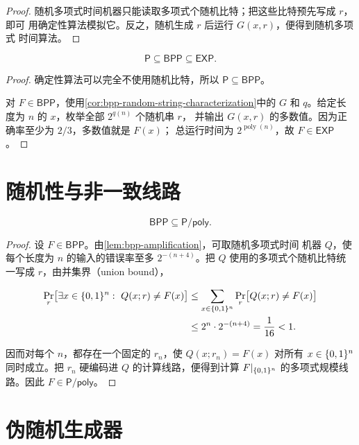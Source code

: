 \begin{proof}
  随机多项式时间机器只能读取多项式个随机比特；把这些比特预先写成 $r$，即可
  用确定性算法模拟它。反之，随机生成 $r$ 后运行 $G(x,r)$，便得到随机多项式
  时间算法。
\end{proof}

\begin{proposition}
  \label{prop:p-subset-bpp-subset-exp}
  \[
    \mathsf P\subseteq\mathsf{BPP}\subseteq\mathsf{EXP}.
  \]
\end{proposition}

\begin{proof}
  确定性算法可以完全不使用随机比特，所以
  $\mathsf P\subseteq\mathsf{BPP}$。

  对 $F\in\mathsf{BPP}$，使用\cref{cor:bpp-random-string-characterization}中的
  $G$ 和 $q$。给定长度为 $n$ 的 $x$，枚举全部 $2^{q(n)}$ 个随机串 $r$，
  并输出 $G(x,r)$ 的多数值。因为正确率至少为 $2/3$，多数值就是 $F(x)$；
  总运行时间为 $2^{\operatorname{poly}(n)}$，故 $F\in\mathsf{EXP}$。
\end{proof}

\section{随机性与非一致线路}

\begin{corollary}
  \label{cor:bpp-subset-p-poly}
  \[
    \mathsf{BPP}\subseteq\mathsf{P/poly}.
  \]
\end{corollary}

\begin{proof}
  设 $F\in\mathsf{BPP}$。由\cref{lem:bpp-amplification}，可取随机多项式时间
  机器 $Q$，使每个长度为 $n$ 的输入的错误率至多 $2^{-(n+4)}$。把 $Q$
  使用的多项式个随机比特统一写成 $r$，由并集界（union bound），

  \begin{align*}
    \Pr_r\bigl[\exists x\in\{0,1\}^n:\ Q(x;r)\neq F(x)\bigr]
      &\leq \sum_{x\in\{0,1\}^n}
        \Pr_r\bigl[Q(x;r)\neq F(x)\bigr] \\
      &\leq 2^n\cdot2^{-(n+4)}
       =\frac1{16}<1.
  \end{align*}

  因而对每个 $n$，都存在一个固定的 $r_n$，使 $Q(x;r_n)=F(x)$ 对所有
  $x\in\{0,1\}^n$ 同时成立。把 $r_n$ 硬编码进 $Q$ 的计算线路，便得到计算
  $F\vert_{\{0,1\}^n}$ 的多项式规模线路。因此 $F\in\mathsf{P/poly}$。
\end{proof}

\section{伪随机生成器}

